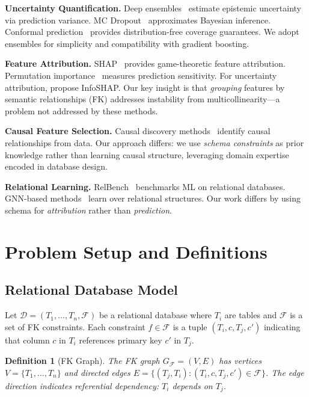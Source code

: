 \documentclass{article}
\newtheorem{definition}{Definition}
\begin{document}
\textbf{Uncertainty Quantification.}
Deep ensembles~\citep{lakshminarayanan2017simple} estimate epistemic uncertainty via
prediction variance. MC Dropout~\citep{gal2016dropout} approximates Bayesian inference.
Conformal prediction~\citep{vovk2005algorithmic} provides distribution-free coverage
guarantees. We adopt ensembles for simplicity and compatibility with gradient boosting.

\textbf{Feature Attribution.}
SHAP~\citep{lundberg2017unified} provides game-theoretic feature attribution.
Permutation importance~\citep{breiman2001random} measures prediction sensitivity.
For uncertainty attribution, \citet{watson2023testing} propose InfoSHAP.
Our key insight is that \emph{grouping} features by semantic relationships (FK)
addresses instability from multicollinearity---a problem not addressed by these methods.

\textbf{Causal Feature Selection.}
Causal discovery methods~\citep{spirtes2000causation,peters2017elements} identify
causal relationships from data. Our approach differs: we use \emph{schema constraints}
as prior knowledge rather than learning causal structure, leveraging domain expertise
encoded in database design.

\textbf{Relational Learning.}
RelBench~\citep{fey2024relbench} benchmarks ML on relational databases.
GNN-based methods~\citep{schlichtkrull2018modeling} learn over relational structures.
Our work differs by using schema for \emph{attribution} rather than \emph{prediction}.

\section{Problem Setup and Definitions}
\label{sec:setup}

\subsection{Relational Database Model}

Let $\mathcal{D} = (T_1, \ldots, T_n, \mathcal{F})$ be a relational database where
$T_i$ are tables and $\mathcal{F}$ is a set of FK constraints. Each constraint
$f \in \mathcal{F}$ is a tuple $(T_i, c, T_j, c')$ indicating that column $c$ in $T_i$
references primary key $c'$ in $T_j$.

\begin{definition}[FK Graph]
The FK graph $G_\mathcal{F} = (V, E)$ has vertices $V = \{T_1, \ldots, T_n\}$ and
directed edges $E = \{(T_j, T_i) : (T_i, c, T_j, c') \in \mathcal{F}\}$. The edge
direction indicates referential dependency: $T_i$ depends on $T_j$.
\end{definition}
\end{document}
